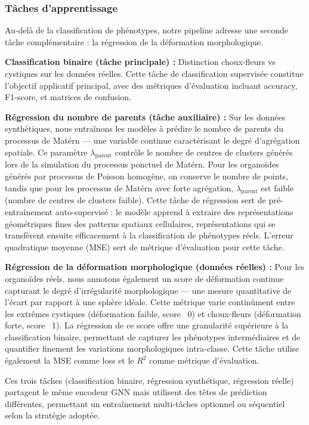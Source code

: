 \subsubsection{Tâches d'apprentissage}

Au-delà de la classification de phénotypes, notre pipeline adresse une seconde tâche complémentaire : la régression de la déformation morphologique.

\textbf{Classification binaire (tâche principale) :}
Distinction choux-fleurs vs cystiques sur les données réelles. Cette tâche de classification supervisée constitue l'objectif applicatif principal, avec des métriques d'évaluation incluant accuracy, F1-score, et matrices de confusion.

\textbf{Régression du nombre de parents (tâche auxiliaire) :}
Sur les données synthétiques, nous entraînons les modèles à prédire le nombre de parents du processus de Matérn — une variable continue caractérisant le degré d'agrégation spatiale. Ce paramètre $\lambda_{\text{parent}}$ contrôle le nombre de centres de clusters générés lors de la simulation du processus ponctuel de Matérn. Pour les organoïdes générés par processus de Poisson homogène, on conserve le nombre de points, tandis que pour les processus de Matérn avec forte agrégation, $\lambda_{\text{parent}}$ est faible (nombre de centres de clusters faible). Cette tâche de régression sert de pré-entraînement auto-supervisé : le modèle apprend à extraire des représentations géométriques fines des patterns spatiaux cellulaires, représentations qui se transfèrent ensuite efficacement à la classification de phénotypes réels. L'erreur quadratique moyenne (MSE) sert de métrique d'évaluation pour cette tâche.

\textbf{Régression de la déformation morphologique (données réelles) :}
Pour les organoïdes réels, nous annotons également un score de déformation continue capturant le degré d'irrégularité morphologique — une mesure quantitative de l'écart par rapport à une sphère idéale. Cette métrique varie continûment entre les extrêmes cystiques (déformation faible, score ~0) et choux-fleurs (déformation forte, score ~1). La régression de ce score offre une granularité supérieure à la classification binaire, permettant de capturer les phénotypes intermédiaires et de quantifier finement les variations morphologiques intra-classe. Cette tâche utilise également la MSE comme loss et le $R^2$ comme métrique d'évaluation.

Ces trois tâches (classification binaire, régression synthétique, régression réelle) partagent le même encodeur GNN mais utilisent des têtes de prédiction différentes, permettant un entraînement multi-tâches optionnel ou séquentiel selon la stratégie adoptée.

